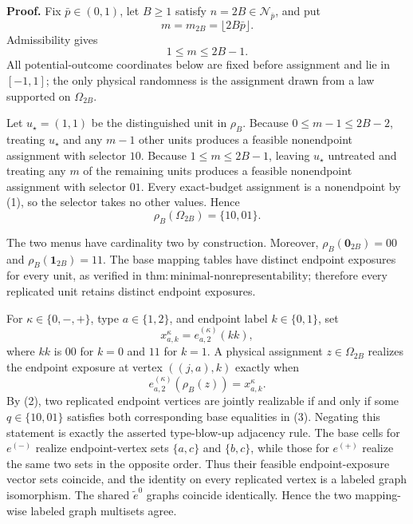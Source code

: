 \textbf{Proof.}
Fix \(\bar p\in(0,1)\), let \(B\ge1\) satisfy \(n=2B\in\mathcal N_{\bar p}\), and put
\[
 m=m_{2B}=\lfloor2B\bar p\rfloor.
\]
Admissibility gives
\[
 1\le m\le2B-1. \tag{1}
\]
All potential-outcome coordinates below are fixed before assignment and lie in \([-1,1]\); the only physical randomness is the assignment drawn from a law supported on \(\Omega_{2B}\).

Let \(u_\star=(1,1)\) be the distinguished unit in \(\rho_B\).  Because \(0\le m-1\le2B-2\), treating \(u_\star\) and any \(m-1\) other units produces a feasible nonendpoint assignment with selector \(10\).  Because \(1\le m\le2B-1\), leaving \(u_\star\) untreated and treating any \(m\) of the remaining units produces a feasible nonendpoint assignment with selector \(01\).  Every exact-budget assignment is a nonendpoint by (1), so the selector takes no other values.  Hence
\[
 \rho_B(\Omega_{2B})=\{10,01\}. \tag{2}
\]

The two menus have cardinality two by construction.  Moreover,
\(\rho_B(\mathbf 0_{2B})=00\) and \(\rho_B(\mathbf 1_{2B})=11\).  The base mapping tables have distinct endpoint exposures for every unit, as verified in \(\mathrm{thm{:}minimal\text{-}nonrepresentability}\); therefore every replicated unit retains distinct endpoint exposures.

For \(\kappa\in\{0,-,+\}\), type \(a\in\{1,2\}\), and endpoint label \(k\in\{0,1\}\), set
\[
 x^\kappa_{a,k}=e^{(\kappa)}_{a,2}(kk),
\]
where \(kk\) is \(00\) for \(k=0\) and \(11\) for \(k=1\).  A physical assignment \(z\in\Omega_{2B}\) realizes the endpoint exposure at vertex \(((j,a),k)\) exactly when
\[
 e^{(\kappa)}_{a,2}(\rho_B(z))=x^\kappa_{a,k}. \tag{3}
\]
By (2), two replicated endpoint vertices are jointly realizable if and only if some \(q\in\{10,01\}\) satisfies both corresponding base equalities in (3).  Negating this statement is exactly the asserted type-blow-up adjacency rule.  The base cells for \(e^{(-)}\) realize endpoint-vertex sets \(\{a,c\}\) and \(\{b,c\}\), while those for \(e^{(+)}\) realize the same two sets in the opposite order.  Thus their feasible endpoint-exposure vector sets coincide, and the identity on every replicated vertex is a labeled graph isomorphism.  The shared \(\widetilde e^0\) graphs coincide identically.  Hence the two mapping-wise labeled graph multisets agree.


